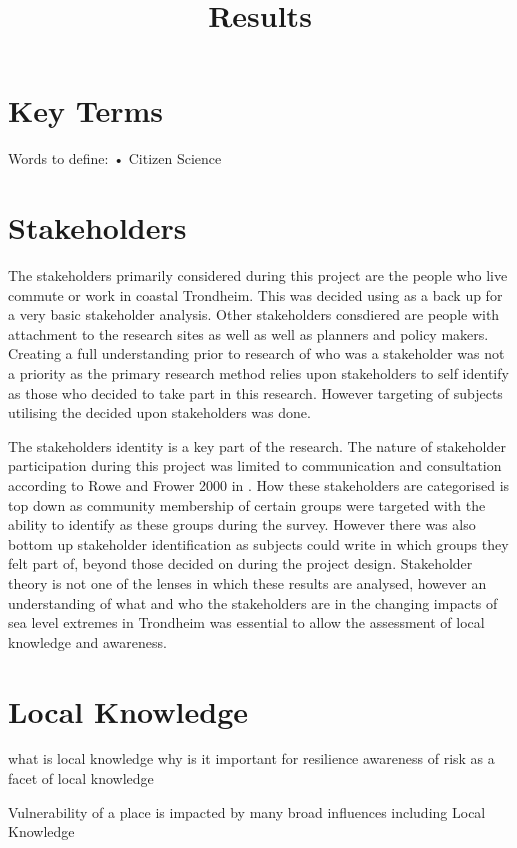 \documentclass{article}
\begin{document}
\title{Results}
\section{Key Terms}
Words to define: 
•	Citizen Science \cite{tweddle_guide_2012}

\section{Stakeholders}

The stakeholders primarily considered during this project are the people who live commute or work in coastal Trondheim. This was decided using \cite{reed_stakeholder_nodate} as a back up for a very basic stakeholder analysis. Other stakeholders consdiered are people with attachment to the research sites as well as well as planners and policy makers. Creating a full understanding prior to research of who was a stakeholder was not a priority as the primary research method relies upon stakeholders to self identify as those who decided to take part in this research. However targeting of subjects utilising the decided upon stakeholders was done. 

The stakeholders identity is a key part of the research. The nature of stakeholder participation during this project was limited to communication and consultation according to Rowe and Frower 2000 in \cite{reed_stakeholder_nodate}. How these stakeholders are categorised is top down as community membership of certain groups were targeted with the ability to identify as these groups during the survey. However there was also bottom up stakeholder identification as subjects could write in which groups they felt part of, beyond those decided on during the project design. Stakeholder theory is not one of the lenses in which these results are analysed, however an understanding of what and who the stakeholders are in the changing impacts of sea level extremes in Trondheim was essential to allow the assessment of local knowledge and awareness. 

\section{Local Knowledge}
what is local knowledge
why is it important for resilience
awareness of risk as a facet of local knowledge 
 



Vulnerability of a place is impacted by many broad influences including Local Knowledge 
\end{document}
